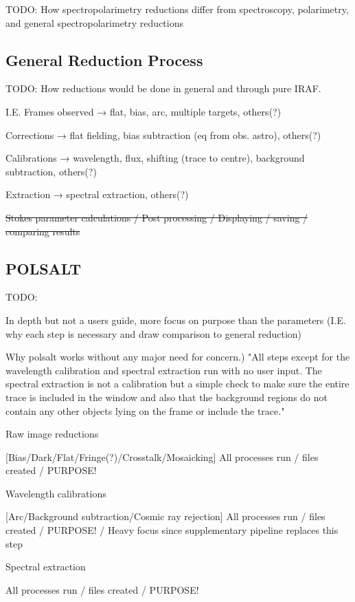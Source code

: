 TODO: How spectropolarimetry reductions differ from spectroscopy, polarimetry, and general spectropolarimetry reductions

\subsection{General Reduction Process} %

TODO: How reductions would be done in general and through pure IRAF.

I.E. Frames observed → flat, bias, arc, multiple targets, others(?)

Corrections → flat fielding, bias subtraction (eq from obs. astro), others(?)

Calibrations → wavelength, flux, shifting (trace to centre), background subtraction, others(?)

Extraction → spectral extraction, others(?)

\sout{Stokes parameter calculations / Post processing / Displaying / saving / comparing results}

\subsection{POLSALT} %

TODO:

In depth but not a users guide, more focus on purpose than the parameters (I.E. why each step is necessary and draw comparison to general reduction)

Why polsalt works without any major need for concern.) "All steps except for the wavelength calibration and spectral extraction run with no user input. The spectral extraction is not a calibration but a simple check to make sure the entire trace is included in the window and also that the background regions do not contain any other objects lying on the frame or include the trace."

\noindent Raw image reductions

[Bias/Dark/Flat/Fringe(?)/Crosstalk/Mosaicking]
All processes run / files created / PURPOSE!

\noindent Wavelength calibrations

[Arc/Background subtraction/Cosmic ray rejection]
All processes run / files created / PURPOSE! / Heavy focus since supplementary pipeline replaces this step

\noindent Spectral extraction

All processes run / files created / PURPOSE!

